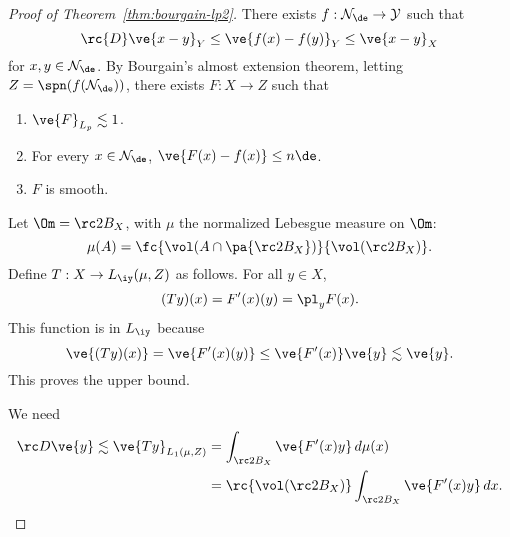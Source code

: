 



\begin{proof}[Proof of Theorem~\ref{thm:bourgain-lp2}]
There exists $f:\cal N_\de\to Y$ such that 
\[
\rc{D} \ve{x-y}_Y\le \ve{f(x)-f(y)}_Y \le \ve{x-y}_X
\]
for $x,y\in \cal N_\de$. By Bourgain's almost extension theorem, letting $Z=\spn(f(\cal N_\de))$, there exists $F:X\to Z$ such that
\begin{enumerate}
\item
$\ve{F}_{L_p}\lesssim1$.
\item
For every $x\in \cal N_\de$, $\ve{F(x)-f(x)}\le n\de$.
\item
$F$ is smooth.
\end{enumerate}

Let $\Om=\rc2B_X$, with $\mu$ the normalized Lebesgue measure on $\Om$:
\[
\mu(A) = \fc{\vol(A\cap \pa{\rc 2B_X})}{\vol(\rc 2B_X)}.
\]
Define $T:X\to L_{\iy}(\mu, Z)$ as follows. For all $y\in X$, 
\[
(Ty)(x) = F'(x)(y)=\pl_yF(x).
\]
This function is in $L_\iy$ because
\[
\ve{(Ty)(x)}=\ve{F'(x)(y)} \le \ve{F'(x)}\ve{y}\lesssim \ve{y}.
\]
This proves the upper bound.

We need 
\begin{align*}
\rc D \ve{y} \lesssim \ve{Ty}_{L_1(\mu,Z)} 
&= \int_{\rc2B_X} \ve{F'(x)y} \,d\mu(x) \\
&=\rc{\vol(\rc2 B_X)}\int_{\rc 2B_X}\ve{F'(x)y}\,dx.
\end{align*}


\end{proof}
